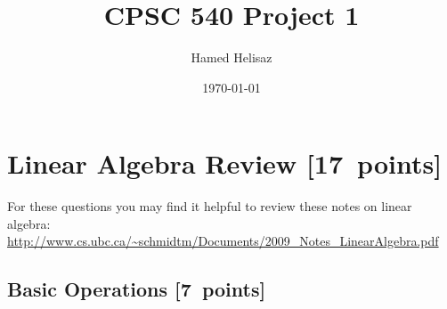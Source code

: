 \documentclass{article}
\newcommand\pts[1]{\textcolor{pointscolour}{[#1~points]}}
\begin{document}
  \title{CPSC 540 Project 1}
    \author{Hamed Helisaz}
    
    \date{\today}
    \maketitle

  \section{Linear Algebra Review \pts{17}}

  For these questions you may find it helpful to review these notes on linear algebra:\\
  \url{http://www.cs.ubc.ca/~schmidtm/Documents/2009_Notes_LinearAlgebra.pdf}

  \subsection{Basic Operations \pts{7}}
\end{document}
